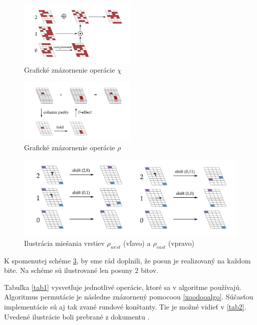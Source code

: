 \begin{figure}[h!]
	\centering
	\includegraphics[width=0.5\textwidth]{figures/xoodoochi}
	\caption{Grafické znázornenie operácie $\chi$ \cite{xcb}}
	\label{xoodoochi}
\end{figure}
\begin{figure}[h!]
	\centering
	\includegraphics[width=0.5\textwidth]{figures/xoodooml}
	\caption{Grafické znázornenie operácie $\rho$ \cite{xcb}}
	\label{xoodooml}
\end{figure}
\begin{figure}[h!]
	\centering
	\includegraphics[width=0.8\linewidth]{figures/xoodooshift}
	\caption{Ilustrácia miešania vrstiev $\rho_{west}$ (vľavo) a $\rho_{east}$ (vpravo)\cite{xcb}}
	\label{xoodooshift}
\end{figure}
K spomenutej schéme \ref{xoodooshift}, by sme rád doplnili, že posun je realizovaný na každom bite. Na schéme sú ilustrované len posuny 2 bitov. 
   
Tabuľka \ref{tab1} vysvetľuje jednotlivé operácie, ktoré sa v algoritme používajú. Algoritmus permutácie je následne znázornený pomocoou \ref{xoodooalgo}. Súčasťou implementácie sú aj tak zvané rundové konštanty. Tie je možné vidieť v \ref{tab2}. Uvedené ilustrácie boli prebrané z dokumentu \cite{xcb}.

